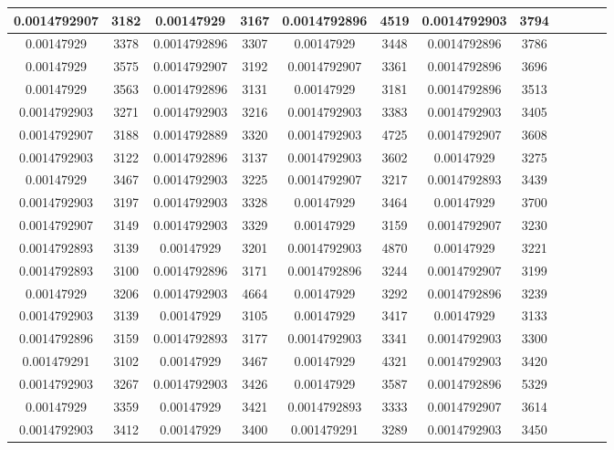 \begin{table}[h]
\begin{tabular}{|c|c|c|c|c|c|c|c|c|c|c|c|}
\midrule
0.0014792907&3182&0.00147929&3167&0.0014792896&4519&0.0014792903&3794\\
\midrule
0.00147929&3378&0.0014792896&3307&0.00147929&3448&0.0014792896&3786\\
\midrule
0.00147929&3575&0.0014792907&3192&0.0014792907&3361&0.0014792896&3696\\
\midrule
0.00147929&3563&0.0014792896&3131&0.00147929&3181&0.0014792896&3513\\
\midrule
0.0014792903&3271&0.0014792903&3216&0.0014792903&3383&0.0014792903&3405\\
\midrule
0.0014792907&3188&0.0014792889&3320&0.0014792903&4725&0.0014792907&3608\\
\midrule
0.0014792903&3122&0.0014792896&3137&0.0014792903&3602&0.00147929&3275\\
\midrule
0.00147929&3467&0.0014792903&3225&0.0014792907&3217&0.0014792893&3439\\
\midrule
0.0014792903&3197&0.0014792903&3328&0.00147929&3464&0.00147929&3700\\
\midrule
0.0014792907&3149&0.0014792903&3329&0.00147929&3159&0.0014792907&3230\\
\midrule
0.0014792893&3139&0.00147929&3201&0.0014792903&4870&0.00147929&3221\\
\midrule
0.0014792893&3100&0.0014792896&3171&0.0014792896&3244&0.0014792907&3199\\
\midrule
0.00147929&3206&0.0014792903&4664&0.00147929&3292&0.0014792896&3239\\
\midrule
0.0014792903&3139&0.00147929&3105&0.00147929&3417&0.00147929&3133\\
\midrule
0.0014792896&3159&0.0014792893&3177&0.0014792903&3341&0.0014792903&3300\\
\midrule
0.001479291&3102&0.00147929&3467&0.00147929&4321&0.0014792903&3420\\
\midrule
0.0014792903&3267&0.0014792903&3426&0.00147929&3587&0.0014792896&5329\\
\midrule
0.00147929&3359&0.00147929&3421&0.0014792893&3333&0.0014792907&3614\\
\midrule
0.0014792903&3412&0.00147929&3400&0.001479291&3289&0.0014792903&3450\\
\midrule
\end{tabular}
    
\end{table}

